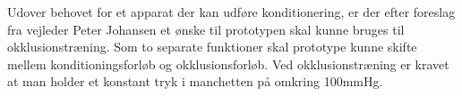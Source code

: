 Udover behovet for et apparat der kan udføre konditionering, er der efter foreslag fra vejleder Peter Johansen et ønske til prototypen skal kunne bruges til okklusionstræning. Som to separate funktioner skal prototype kunne skifte mellem konditioningsforløb og okklusionsforløb. Ved okklusionstræning er kravet at man holder et konstant tryk i manchetten på omkring 100mmHg. 

